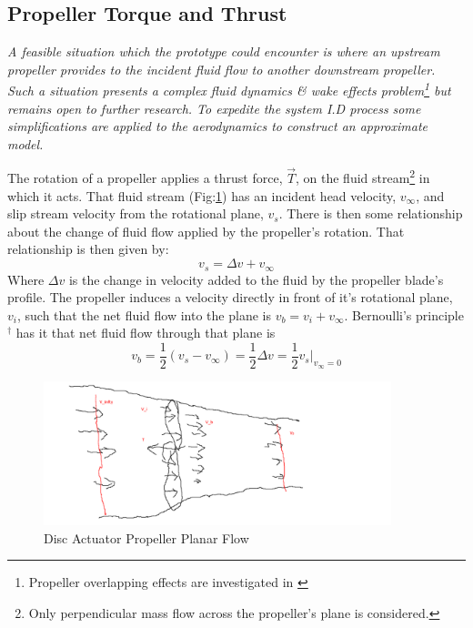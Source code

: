 \subsection{Propeller Torque and Thrust}
\label{subsec:dynamics.aero.bem}
\emph{\color{Gray} A feasible situation which the prototype could encounter is where an upstream propeller provides to the incident fluid flow to another downstream propeller. Such a situation presents a complex fluid dynamics \& wake effects problem\footnote{Propeller overlapping effects are investigated in \cite{configurationpropulsion}} but remains open to further research. To expedite the system I.D process some simplifications are applied to the aerodynamics to construct an approximate model.}
\par
The rotation of a propeller applies a thrust force, $\vec{T}$, on the fluid stream\footnote{Only perpendicular mass flow across the propeller's plane is considered.} in which it acts. That fluid stream (Fig:\ref{fig:bem-flow}) has an incident head velocity, $v_\infty$, and slip stream velocity from the rotational plane, $v_s$. There is then some relationship about the change of fluid flow applied by the propeller's rotation. That relationship is then given by:
\begin{equation}
v_ s = \Delta v + v_\infty
\end{equation}
Where $\Delta v$ is the change in velocity added to the fluid by the propeller blade's profile. The propeller induces a velocity directly in front of it's rotational plane, $v_i$, such that the net fluid flow into the plane is $v_b=v_i+v_\infty$. Bernoulli's principle$^{\dagger}$ has it that net fluid flow through that plane is
\begin{equation}\label{eq:bernoulli}
v_b = \frac{1}{2} ( v_s - v_{\infty} ) = \frac{1}{2} \Delta v = \frac{1}{2} v_s \big|_{v_\infty=0}
\end{equation}
\begin{figure}[htbp]
\centering
\includegraphics[width=0.9\textwidth]{figs/bem-flow}
\caption{Disc Actuator Propeller Planar Flow}
\label{fig:bem-flow}
\end{figure}
